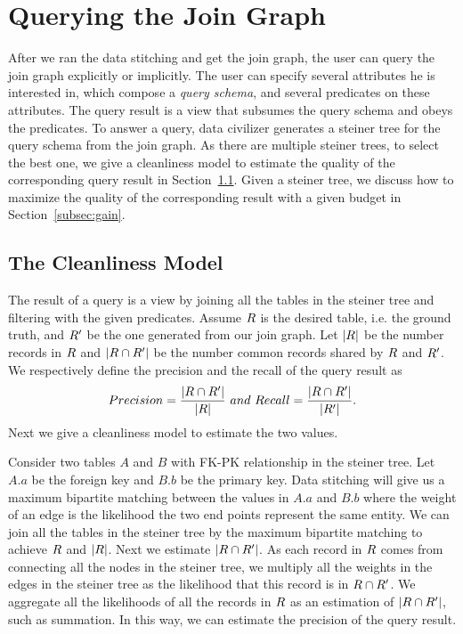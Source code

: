 

\section{Querying the Join Graph}\label{sec:enhancedstitching}


After we ran the data stitching and get the join graph, the user can query the join graph explicitly or implicitly. The user can specify several attributes he is interested in, which compose a \emph{query schema}, and several predicates on these attributes. The query result is a view that subsumes the query schema and obeys the predicates. To answer a query, data civilizer generates a steiner tree for the query schema from the join graph. As there are multiple steiner trees, to select the best one, we give a cleanliness model to estimate the quality of the corresponding query result in Section~\ref{subsec:model:recall}. Given a steiner tree, we discuss how to maximize the quality of the corresponding result with a given budget in Section~\ref{subsec:gain}.





\subsection{The Cleanliness Model}\label{subsec:model:recall}

The result of a query is a view by joining all the tables in the steiner tree and filtering with the given predicates. Assume $R$ is the desired table, i.e. the ground truth, and $R'$ be the one generated from our join graph. Let  $|R|$ be the number records in $R$ and $|R\cap R'|$ be the number common records shared by $R$ and $R'$. We respectively define the precision and the recall of the query result as
$$Precision=\frac{|R\cap R'|}{|R|}~and~Recall=\frac{|R\cap R'|}{|R'|}.$$
Next we give a cleanliness model to estimate the two values.



Consider two tables $A$ and $B$ with FK-PK relationship in the steiner tree. Let $A.a$ be the foreign key and $B.b$ be the primary key. Data stitching will give us a maximum bipartite matching between the values in $A.a$ and $B.b$ where the weight of an edge is the likelihood the two end points represent the same entity. We can join all the tables in the steiner tree by the maximum bipartite matching to achieve $R$ and $|R|$. Next we estimate $|R\cap R'|$. As each record in $R$ comes from connecting all the nodes in the steiner tree, we multiply all the weights in the edges in the steiner tree as the likelihood that this record is in $R\cap R'$. We aggregate all the likelihoods of all the records in $R$ as an estimation of $|R\cap R'|$, such as summation. In this way, we can estimate the precision of the query result.


